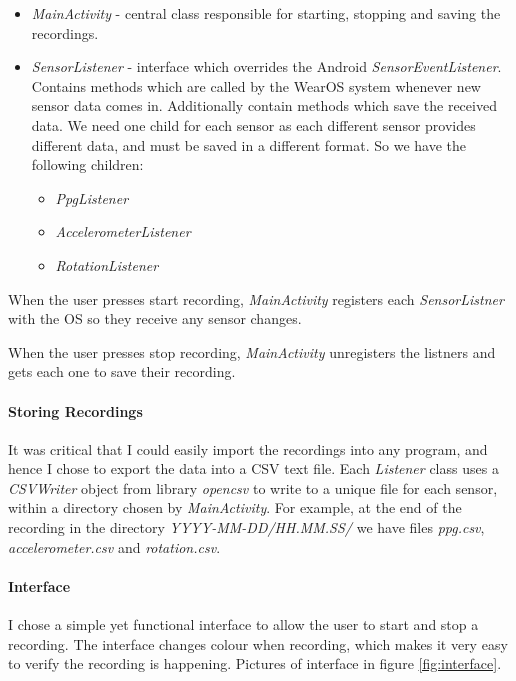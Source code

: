 \documentclass[12pt,a4paper,twoside,openright]{report}
\begin{document}
\begin{itemize}
	\item \emph{MainActivity} - central class responsible for starting,
		stopping and saving the recordings.

	\item \emph{SensorListener} - interface which overrides the Android
		\emph{SensorEventListener}. Contains methods which
		are called by the WearOS system whenever new sensor data comes
		in. Additionally contain methods which save the received data.
		We need one child for each sensor as each different sensor
		provides different data, and must be saved in a different
		format. So we have the following children:

	\begin{itemize}
		\item \emph{PpgListener}
		\item \emph{AccelerometerListener}
		\item \emph{RotationListener}
	\end{itemize}

\end{itemize}

When the user presses start recording, \emph{MainActivity} registers each
\emph{SensorListner} with the OS so they receive any sensor changes.

When the user presses stop recording, \emph{MainActivity} unregisters the
listners and gets each one to save their recording.

\paragraph{Storing Recordings}

It was critical that I could easily import the recordings into any program, and
hence I chose to export the data into a CSV text file. Each \emph{Listener}
class uses a \emph{CSVWriter} object from library \emph{opencsv} to write to a
unique file for each sensor, within a directory chosen by \emph{MainActivity}.
For example, at the end of the recording in the directory
\emph{YYYY-MM-DD/HH.MM.SS/} we have files \emph{ppg.csv},
\emph{accelerometer.csv} and \emph{rotation.csv}.

\paragraph{Interface}

I chose a simple yet functional interface to allow the user to start and stop
a recording. The interface changes colour when recording, which makes it very
easy to verify the recording is happening. Pictures of interface in figure
\ref{fig:interface}.
\end{document}

